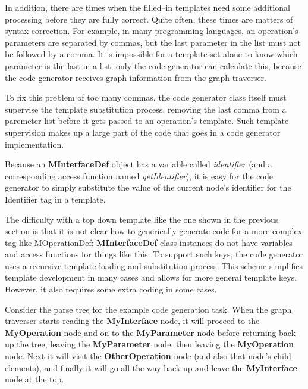 In addition, there are times when the filled--in templates need some additional
processing before they are fully correct. Quite often, these times are matters
of syntax correction. For example, in many programming languages, an operation's
parameters are separated by commas, but the last parameter in the list must not
be followed by a comma. It is impossible for a template set alone to know which
parameter is the last in a list; only the code generator can calculate this,
because the code generator receives graph information from the graph traverser.

To fix this problem of too many commas, the code generator class itself must
supervise the template substitution process, removing the last comma from a
paremeter list before it gets passed to an operation's template. Such template
supervision makes up a large part of the code that goes in a code generator
implementation.
















Because an {\bf MInterfaceDef} object has a variable called {\it identifier\/}
(and a corresponding access function named {\it getIdentifier\/}), it is easy
for the code generator to simply substitute the value of the current node's
identifier for the {\sf Identifier} tag in a template.

The difficulty with a top down template like the one shown in the previous
section is that it is not clear how to generically generate code for a more
complex tag like {\sf MOperationDef}: {\bf MInterfaceDef} class instances do not
have variables and access functions for things like this. To support such keys,
the code generator uses a recursive template loading and substitution process.
This scheme simplifies template development in many cases and allows for more
general template keys. However, it also requires some extra coding in some
cases.

Consider the parse tree for the example code generation task. When the graph
traverser starts reading the {\bf MyInterface} node, it will proceed to the {\bf
MyOperation} node and on to the {\bf MyParameter} node before returning back up
the tree, leaving the {\bf MyParameter} node, then leaving the {\bf MyOperation}
node. Next it will visit the {\bf OtherOperation} node (and also that node's
child elements), and finally it will go all the way back up and leave the {\bf
MyInterface} node at the top.

